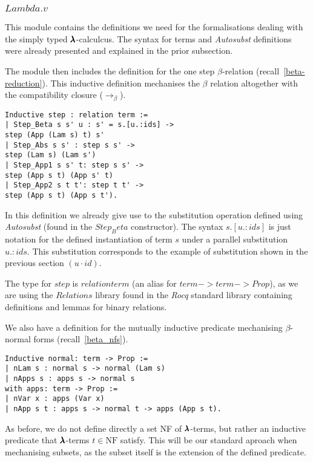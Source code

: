\subsubsection{\lst$Lambda.v$}

This module contains the definitions we need for the formalisations dealing with the simply typed $\pmb{\lambda}$-calculcus.
The syntax for terms and \textit{Autosubst} definitions were already presented and explained in the prior subsection.

The module then includes the definition for the one step $\beta$-relation (recall~\cref{beta-reduction}).
This inductive definition mechanises the $\beta$ relation altogether with the compatibility closure ($\to_\beta$).
\begin{lstlisting}[language=Coq]
Inductive step : relation term :=
| Step_Beta s s' u : s' = s.[u.:ids] ->
step (App (Lam s) t) s'
| Step_Abs s s' : step s s' ->
step (Lam s) (Lam s')
| Step_App1 s s' t: step s s' ->
step (App s t) (App s' t)
| Step_App2 s t t': step t t' ->
step (App s t) (App s t').
\end{lstlisting}

In this definition we already give use to the substitution operation defined using \textit{Autosubst} (found in the \lst$Step_Beta$ constructor).
The syntax \lst$s.[u.:ids]$ is just notation for the defined instantiation of term $s$ under a parallel substitution \lst$u.:ids$.
This substitution corresponds to the example of substitution shown in the previous section $(u \cdot id)$.

The type for \lst$step$ is \lst$relation term$ (an alias for \lst$term->term->Prop$), as we are using the \lst$Relations$ library found in the \textit{Rocq} standard library containing definitions and lemmas for binary relations.

We also have a definition for the mutually inductive predicate mechanising $\beta$-normal forms (recall~\cref{beta_nfs}).
\begin{lstlisting}[language=Coq]
Inductive normal: term -> Prop :=
| nLam s : normal s -> normal (Lam s)
| nApps s : apps s -> normal s  
with apps: term -> Prop :=
| nVar x : apps (Var x)
| nApp s t : apps s -> normal t -> apps (App s t).
\end{lstlisting}

As before, we do not define directly a set NF of $\pmb{\lambda}$-terms, but rather an inductive predicate that $\pmb{\lambda}$-terms $t \in \text{NF}$ satisfy.
This will be our standard aproach when mechanising subsets, as the subset itself is the extension of the defined predicate.

